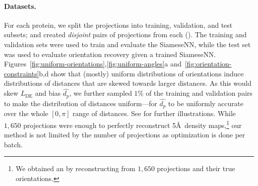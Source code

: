 \paragraph{Datasets.}
For each protein, we split the projections into training, validation, and test subsets; and created \textit{disjoint} pairs of projections from each ().
The training and validation sets were used to train and evaluate the SiameseNN, while the test set was used to evaluate orientation recovery given a trained SiameseNN.
Figures~\ref{fig:uniform-orientations},\ref{fig:uniform-angles}a and~\ref{fig:orientation-constraints}b,d show that (mostly) uniform distributions of orientations induce distributions of distances that are skewed towards larger distances.
As this would skew $L_\text{DE}$ and bias $\widehat{d_p}$, we further sampled $1\%$ of the training and validation pairs to make the distribution of distances uniform---for $\widehat{d_p}$ to be uniformly accurate over the whole $[0,\pi]$ range of distances.
See  for further illustrations.
While $1,650$ projections were enough to perfectly reconstruct 5\AA\ density maps,\footnote{We obtained an  by reconstructing from $1,650$ projections and their true orientations.} our method is not limited by the number of projections as optimization is done per batch.

